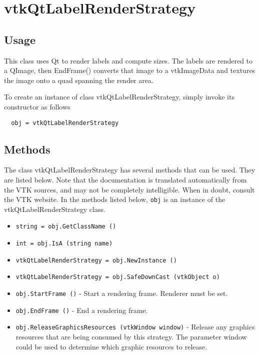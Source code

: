\section{vtkQtLabelRenderStrategy}

\subsection{Usage}

 This class uses Qt to render labels and compute sizes. The labels are
 rendered to a QImage, then EndFrame() converts that image to a vtkImageData
 and textures the image onto a quad spanning the render area.

To create an instance of class vtkQtLabelRenderStrategy, simply
invoke its constructor as follows
\begin{verbatim}
  obj = vtkQtLabelRenderStrategy
\end{verbatim}
\subsection{Methods}

The class vtkQtLabelRenderStrategy has several methods that can be used.
  They are listed below.
Note that the documentation is translated automatically from the VTK sources,
and may not be completely intelligible.  When in doubt, consult the VTK website.
In the methods listed below, \verb|obj| is an instance of the vtkQtLabelRenderStrategy class.
\begin{itemize}
\item  \verb|string = obj.GetClassName ()|

\item  \verb|int = obj.IsA (string name)|

\item  \verb|vtkQtLabelRenderStrategy = obj.NewInstance ()|

\item  \verb|vtkQtLabelRenderStrategy = obj.SafeDownCast (vtkObject o)|

\item  \verb|obj.StartFrame ()| -  Start a rendering frame. Renderer must be set.

\item  \verb|obj.EndFrame ()| -  End a rendering frame.

\item  \verb|obj.ReleaseGraphicsResources (vtkWindow window)| -  Release any graphics resources that are being consumed by this strategy.
 The parameter window could be used to determine which graphic
 resources to release.

\end{itemize}
